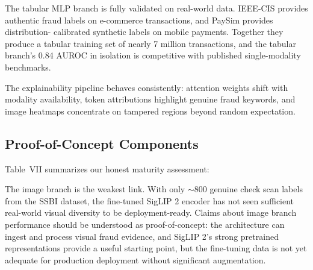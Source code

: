 \documentclass[10pt,conference,letterpaper]{IEEEtran}
\begin{document}
The tabular MLP branch is fully validated on real-world data. IEEE-CIS provides
authentic fraud labels on e-commerce transactions, and PaySim provides distribution-
calibrated synthetic labels on mobile payments. Together they produce a tabular training
set of nearly 7 million transactions, and the tabular branch's 0.84 AUROC in isolation
is competitive with published single-modality benchmarks.

The explainability pipeline behaves consistently: attention weights shift with modality
availability, token attributions highlight genuine fraud keywords, and image heatmaps
concentrate on tampered regions beyond random expectation.

\subsection{Proof-of-Concept Components}

Table~VII summarizes our honest maturity assessment:

\begin{table}[H]
\caption{Component Maturity Assessment}
\label{tab:maturity}
\begin{center}
\end{center}
\end{table}

The image branch is the weakest link. With only $\sim$800 genuine check scan labels from
the SSBI dataset, the fine-tuned SigLIP 2 encoder has not seen sufficient real-world
visual diversity to be deployment-ready. Claims about image branch performance should be
understood as proof-of-concept: the architecture can ingest and process visual fraud
evidence, and SigLIP 2's strong pretrained representations provide a useful starting
point, but the fine-tuning data is not yet adequate for production deployment without
significant augmentation.
\end{document}
